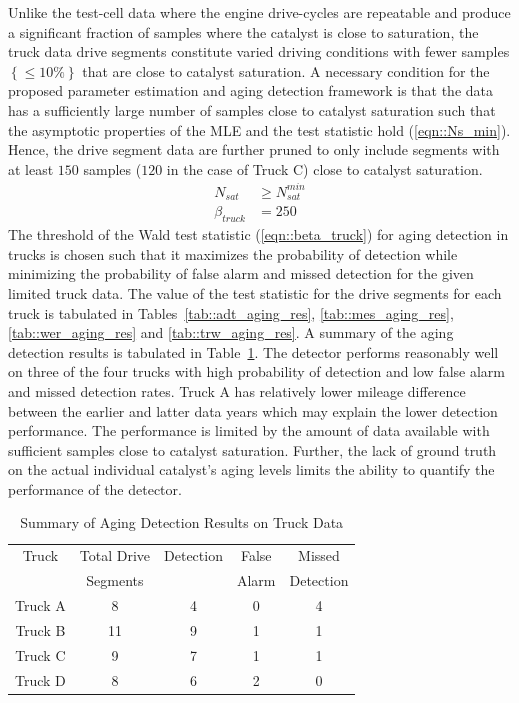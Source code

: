 \documentclass[subscriptcorrection,upint,varvw,barcolor=Goldenrod3,mathalfa=cal=euler,balance,hyphenate,french,pdf-a]{asmejour}
\newcommand{\lrf}[1]{\left\{ #1 \right\}}
\begin{document}
Unlike the test-cell data where the engine drive-cycles are repeatable and produce a significant fraction of samples where the catalyst is close to saturation, the truck data drive segments constitute varied driving conditions with fewer samples $\lrf{\leq 10\%}$ that are close to catalyst saturation. A necessary condition for the proposed parameter estimation and aging detection framework is that the data has a sufficiently large number of samples close to catalyst saturation such that the asymptotic properties of the MLE and the test statistic hold (\ref{eqn::Ns_min}). Hence, the drive segment data are further pruned to only include segments with at least $150$ samples ($120$ in the case of Truck C) close to catalyst saturation.
\begin{align}
        N_{sat}       & \geq N_{sat}^{min} \label{eqn::Ns_min} \\
        \beta_{truck} & = 250 \label{eqn::beta_truck}
\end{align}
The threshold of the Wald test statistic (\ref{eqn::beta_truck}) for aging detection in trucks is chosen such that it
maximizes the probability of detection while minimizing the probability of false alarm and missed detection for the
given limited truck data. The value of the test statistic for the drive segments for each truck is tabulated in
Tables~\ref{tab::adt_aging_res}, \ref{tab::mes_aging_res}, \ref{tab::wer_aging_res} and \ref{tab::trw_aging_res}. A
summary of the aging detection results is tabulated in Table~\ref{tab::truck_aging_summary}. The detector performs
reasonably well on three of the four trucks with high probability of detection and low false alarm and missed detection
rates. Truck A has relatively lower mileage difference between the earlier and latter data years which may explain the
lower detection performance. The performance is limited by the amount of data available with sufficient samples close to
catalyst saturation. Further, the lack of ground truth on the actual individual catalyst's aging levels limits the
ability to quantify the performance of the detector.
\begin{table}[ht]
        \centering
        \caption{Summary of Aging Detection Results on Truck Data}
        \label{tab::truck_aging_summary}
        \begin{tabular}{c c c c c}
                \hline \hline
                Truck   & Total Drive & Detection & False & Missed    \\
                        & Segments    &           & Alarm & Detection \\\hline \hline
                Truck A & 8           & 4         & 0     & 4         \\
                Truck B & 11          & 9         & 1     & 1         \\
                Truck C & 9           & 7         & 1     & 1         \\
                Truck D & 8           & 6         & 2     & 0         \\
                \hline \hline
        \end{tabular}
\end{table}
\end{document}
